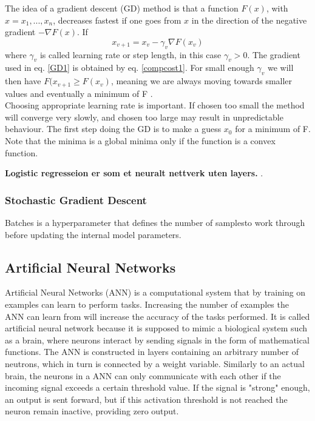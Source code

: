 \documentclass[a4paper,11pt,twocolumn]{article}
\begin{document}
The idea of a gradient descent (GD) method is that a function $F(x)$, with $x=x_1,...,x_n$, decreases fastest if one goes from $x$ in the direction of the negative gradient $-\nabla F(x)$. If 
\begin{equation}
x_{v+1}=x_v-\gamma_v\nabla F(x_v)
\label{GD1}
\end{equation}
where $\gamma_v$ is called learning rate or step length, in this case $\gamma_v>0$. The gradient used in eq. \eqref{GD1} is obtained by eq. \eqref{compcost1}. For small enough $\gamma_v$ we will then have $F(x_{v+1}\geq F(x_v)$, meaning we are always moving towards smaller values and eventually a minimum of F \cite{slides}.
\\ 
Choosing appropriate learning rate is important. If chosen too small the method will converge very slowly, and chosen too large may result in unpredictable behaviour. The first step doing the GD is to make a guess $x_0$ for a minimum of F. Note that the minima is a global minima only if the function is a convex function. 

\textbf{Logistic regresseion er som et neuralt nettverk uten layers.} 
\cite{slides}. 

\subsubsection{Stochastic Gradient Descent}

Batches is a hyperparameter that defines the number of samplesto work through before updating the internal model parameters. 

\subsection{Artificial Neural Networks}

Artificial Neural Networks (ANN) is a computational system that by training on examples can learn to perform tasks. Increasing the number of examples the ANN can learn from will increase the accuracy of the tasks performed. It is called artificial neural network because it is supposed to mimic a biological system such as a brain, where neurons interact by sending signals in the form of mathematical functions. The ANN is constructed in layers containing an arbitrary number of neutrons, which in turn is connected by a weight variable. Similarly to an actual brain, the neurons in a ANN can only communicate with each other if the incoming signal exceeds a certain threshold value. If the signal is "strong" enough, an output is sent forward, but if this activation threshold is not reached the neuron remain inactive, providing zero output\cite{slides}. 
\\
\end{document}
